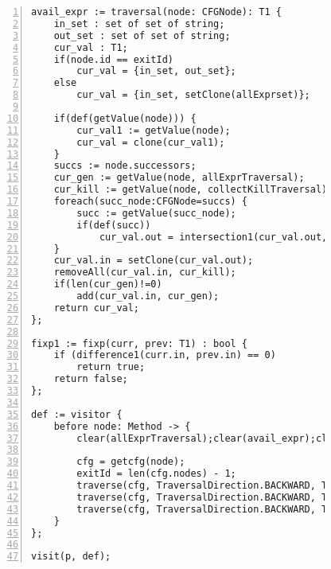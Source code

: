 \begin{figure}[ht!]
\begin{lstlisting}[numbers=left, tabsize=4, escapechar=@, caption={Very busy expression},label={lst:vbe-code}, lastline = 45]
avail_expr := traversal(node: CFGNode): T1 {
	in_set : set of set of string;
	out_set : set of set of string;
	cur_val : T1;
	if(node.id == exitId)
		cur_val = {in_set, out_set};
	else
		cur_val = {in_set, setClone(allExprset)};

	if(def(getValue(node))) {
		cur_val1 := getValue(node);
		cur_val = clone(cur_val1);
	}
	succs := node.successors;
	cur_gen := getValue(node, allExprTraversal);
	cur_kill := getValue(node, collectKillTraversal);
	foreach(succ_node:CFGNode=succs) {
		succ := getValue(succ_node);
		if(def(succ))
			cur_val.out = intersection1(cur_val.out, succ.in);
	}
	cur_val.in = setClone(cur_val.out);
	removeAll(cur_val.in, cur_kill);
	if(len(cur_gen)!=0)
		add(cur_val.in, cur_gen);
	return cur_val;
};

fixp1 := fixp(curr, prev: T1) : bool {
	if (difference1(curr.in, prev.in) == 0)
		return true;	
	return false;
};

def := visitor {
	before node: Method -> {
		clear(allExprTraversal);clear(avail_expr);clear(collectKillTraversal);clear(allExprset);

		cfg = getcfg(node);
		exitId = len(cfg.nodes) - 1;
		traverse(cfg, TraversalDirection.BACKWARD, TraversalKind.HYBRID, allExprTraversal);
		traverse(cfg, TraversalDirection.BACKWARD, TraversalKind.HYBRID, collectKillTraversal);
		traverse(cfg, TraversalDirection.BACKWARD, TraversalKind.HYBRID, avail_expr, fixp1);
	}
};

visit(p, def);
\end{lstlisting}
\end{figure}